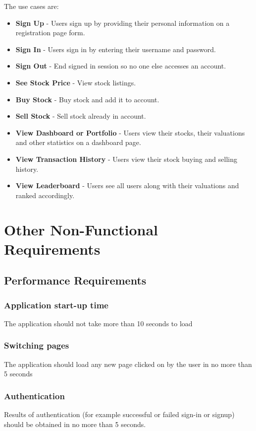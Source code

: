 \documentclass[12 pt, a4paper]{report}
\begin{document}
The use cases are:
\begin{itemize}
\item \textbf{Sign Up} - Users sign up by providing their personal information on a registration page form.
\item \textbf{Sign In} - Users sign in by entering their username and password.
\item \textbf{Sign Out} - End signed in session so no one else accesses an account.
\item \textbf{See Stock Price} - View stock listings.
\item \textbf{Buy Stock} - Buy stock and add it to account.
\item \textbf{Sell Stock} - Sell stock already in account.
\item \textbf{View Dashboard or Portfolio} - Users view their stocks, their valuations and other statistics on a dashboard page.
\item \textbf{View Transaction History} - Users view their stock buying and selling history.
\item \textbf{View Leaderboard} - Users see all users along with their valuations and ranked accordingly.
\end{itemize}
	

	
	\chapter {Other Non-Functional Requirements}
	\section {Performance Requirements}

	\subsection{Application start-up time}
	The application should not take more than 10 seconds to load
	\subsection{Switching pages}
	The application should load any new page clicked on by the user in no more than 5 seconds
	\subsection{Authentication}
	Results of authentication (for example successful or failed sign-in or signup) should be obtained in no more than 5 seconds.
\end{document}
